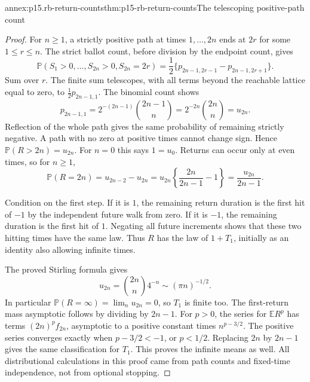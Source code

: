 \begin{annexitem}{annex:p15.rb-return-counts}{thm:p15-rb-return-counts}{The telescoping positive-path count}
\begin{proof}
For \(n\geq1\), a strictly positive path at times
\(1,\ldots,2n\) ends at \(2r\) for some \(1\leq r\leq n\).
The strict ballot count, before division by the endpoint count,
gives
\[
 \mathbb P(S_1>0,\ldots,S_{2n}>0,S_{2n}=2r)
 =\frac12\{p_{2n-1,2r-1}-p_{2n-1,2r+1}\}.
 \]
Sum over \(r\). The finite sum telescopes, with all terms
beyond the reachable lattice equal to zero, to
\(\tfrac12p_{2n-1,1}\).
The binomial count shows
\[
 p_{2n-1,1}
 =2^{-(2n-1)}\binom{2n-1}{n}
 =2^{-2n}\binom{2n}{n}=u_{2n}.
 \]
Reflection of the whole path gives the same probability of
remaining strictly negative. A path with no zero at positive
times cannot change sign. Hence
\(\mathbb P(R>2n)=u_{2n}\).
For \(n=0\) this says \(1=u_0\).
Returns can occur only at even times, so for \(n\geq1\),
\[
 \mathbb P(R=2n)
 =u_{2n-2}-u_{2n}
 =u_{2n}\left\{\frac{2n}{2n-1}-1\right\}
 =\frac{u_{2n}}{2n-1}.
 \]

Condition on the first step. If it is \(1\), the remaining
return duration is the first hit of \(-1\) by the independent
future walk from zero. If it is \(-1\), the remaining duration
is the first hit of \(1\). Negating all future increments
shows that these two hitting times have the same law.
Thus \(R\) has the law of \(1+T_1\), initially as an identity
also allowing infinite times.

The proved Stirling formula gives
\[
 u_{2n}=\binom{2n}{n}4^{-n}\sim(\pi n)^{-1/2}.
 \]
In particular \(\mathbb P(R=\infty)=\lim_nu_{2n}=0\),
so \(T_1\) is finite too. The first-return mass asymptotic follows
by dividing by \(2n-1\).
For \(p>0\), the series for \(\mathbb ER^p\) has terms
\((2n)^p f_{2n}\), asymptotic to a positive constant times
\(n^{p-3/2}\). The positive series converges exactly when
\(p-3/2<-1\), or \(p<1/2\).
Replacing \(2n\) by \(2n-1\) gives the same classification
for \(T_1\). This proves the infinite means as well.
All distributional calculations in this proof came from path
counts and fixed-time independence, not from optional stopping.
\end{proof}
\end{annexitem}

